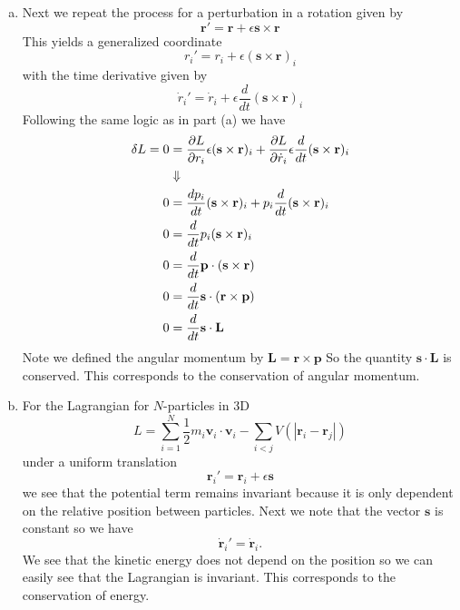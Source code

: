 \documentclass[11pt]{article}
\numberwithin{equation}{section}
\begin{document}
\begin{enumerate}[(a)]
\item Next we repeat the process for a perturbation in a rotation given by
$$\mathbf{r}' = \mathbf{r}+\epsilon\mathbf{s}\times\mathbf{r}$$
This yields a generalized coordinate 
$$r_i' = r_i + \epsilon(\mathbf{s}\times\mathbf{r})_i$$
with the time derivative given by
$$\dot{r}_i' = \dot{r}_i + \epsilon\frac{d}{dt}(\mathbf{s}\times\mathbf{r})_i$$
Following the same logic as in part (a) we have
\begin{align*}
\delta{L} = 0 &= \frac{\partial{L}}{\partial{r_i}}\epsilon(\mathbf{s}\times\mathbf{r})_i + \frac{\partial{L}}{\partial{\dot{r}_i}}\epsilon\frac{d}{dt}(\mathbf{s}\times\mathbf{r})_i\\
&\Downarrow\\
0 &= \frac{dp_i}{dt}(\mathbf{s}\times\mathbf{r})_i + p_i\frac{d}{dt}(\mathbf{s}\times\mathbf{r})_i\\
0 &= \frac{d}{dt}p_i(\mathbf{s}\times\mathbf{r})_i \\
0 &= \frac{d}{dt}\mathbf{p}\cdot(\mathbf{s}\times\mathbf{r}) \\
0 &= \frac{d}{dt}\mathbf{s}\cdot(\mathbf{r}\times\mathbf{p}) \\
0 &= \frac{d}{dt}\mathbf{s}\cdot\mathbf{L}
\end{align*}
Note we defined the angular momentum by $\mathbf{L} = \mathbf{r}\times\mathbf{p}$ So the 
quantity $\mathbf{s}\cdot\mathbf{L}$ is conserved. This corresponds to the conservation of
angular momentum.

\item For the Lagrangian for $N$-particles in 3D
$$L = \sum_{i=1}^{N}\frac{1}{2}m_i\mathbf{v}_i\cdot\mathbf{v}_i - \sum_{i<j}V\left(|\mathbf{r}_i-\mathbf{r}_j|\right)$$
under a uniform translation 
$$\mathbf{r}_i' = \mathbf{r}_i+\epsilon\mathbf{s}$$
we see that the potential term remains invariant because it is only dependent on the 
relative position between particles. Next we note that the vector $\mathbf{s}$ is constant 
so we have
$$\dot{\mathbf{r}}_i' = \dot{\mathbf{r}}_i.$$
We see that the kinetic energy does not depend on the position so we can easily see that
the Lagrangian is invariant. This corresponds to the conservation of energy.
\end{enumerate}

\pagebreak
\end{document}
